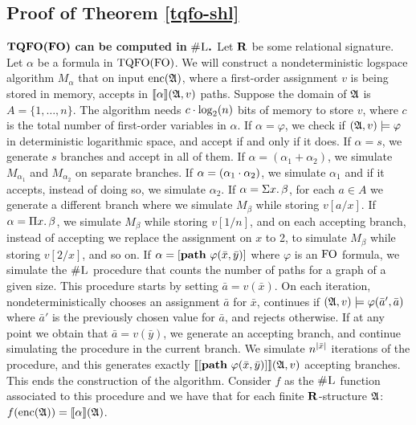 \subsection*{Proof of Theorem \ref{tqfo-shl}}
$\boldsymbol{{\rm TQFO}({\rm FO})}$ {\bf can be computed in} $\boldsymbol{\text{\sc \#L}.}$
Let $\mathbf{R}$ be some relational signature. Let $\alpha$ be a formula in ${\rm TQFO}({\rm FO})$. We will construct a nondeterministic logspace algorithm $M_{\alpha}$ that on input ${\rm enc}(\mathfrak{A})$, where a first-order assignment $v$ is being stored in memory, accepts in ${\llbracket{}{\alpha}\rrbracket}(\mathfrak{A},v)$ paths. Suppose the domain of $\mathfrak{A}$ is $A = \{1,\ldots,n\}$. The algorithm needs $c\cdot\log_2(n)$ bits of memory to store $v$, where $c$ is the total number of first-order variables in $\alpha$. If $\alpha = \varphi$, we check if $(\mathfrak{A},v)\models\varphi$ in deterministic logarithmic space, and accept if and only if it does. If $\alpha = s$, we generate $s$ branches and accept in all of them. If $\alpha = (\alpha_1 + \alpha_2)$, we simulate $M_{\alpha_1}$ and $M_{\alpha_2}$ on separate branches. If $\alpha = (\alpha_1\cdot\alpha_2)$, we simulate $\alpha_1$ and if it accepts, instead of doing so, we simulate $\alpha_2$. If $\alpha = \Sigma{x}.\,\beta$, for each $a\in A$ we generate a different branch where we simulate $M_{\beta}$ while storing $v[a/x]$. If $\alpha = \Pi{x}.\,\beta$, we simulate $M_{\beta}$ while storing $v[1/n]$, and on each accepting branch, instead of accepting we replace the assignment on $x$ to 2, to simulate $M_{\beta}$ while storing $v[2/x]$, and so on. If $\alpha = [{\bf path} \,\, \varphi(\bar{x},\bar{y})]$ where $\varphi$ is an ${\rm FO}$ formula, we simulate the $\text{\sc \#L}$ procedure that counts the number of paths for a graph of a given size. This procedure starts by setting $\bar{a} = v(\bar{x})$. On each iteration, nondeterministically chooses an assignment $\bar{a}$ for $\bar{x}$, continues if $(\mathfrak{A},v)\models\varphi(\bar{a}',\bar{a})$ where $\bar{a}'$ is the previously chosen value for $\bar{a}$, and rejects otherwise. If at any point we obtain that $\bar{a} = v(\bar{y})$, we generate an accepting branch, and continue simulating the procedure in the current branch. We simulate $n^{\vert \bar{x} \vert}$ iterations of the procedure, and this generates exactly ${\llbracket{}{[{\bf path} \,\, \varphi(\bar{x},\bar{y})]}\rrbracket}(\mathfrak{A},v)$ accepting branches. This ends the construction of the algorithm. Consider $f$ as the $\text{\sc \#L}$ function associated to this procedure and we have that for each finite $\mathbf{R}$-structure $\mathfrak{A}$: $f({\rm enc}(\mathfrak{A})) = {\llbracket{}{\alpha}\rrbracket}(\mathfrak{A})$.

